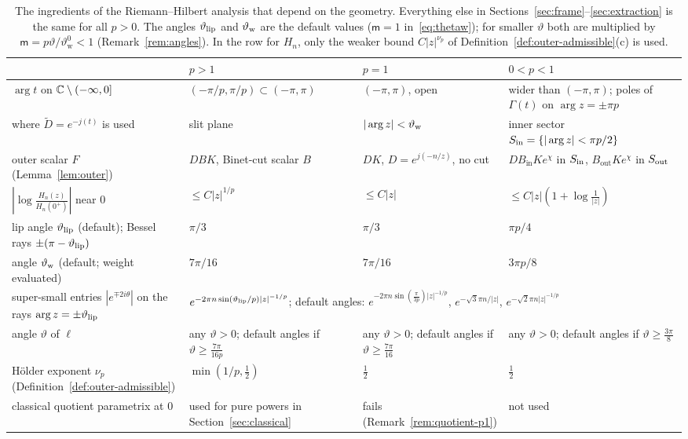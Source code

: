 \begin{table}[ht]
\centering\small
\renewcommand{\arraystretch}{1.25}
\begin{tabular}{@{}p{3.3cm}p{3.2cm}p{3.1cm}p{3.6cm}@{}}
\toprule
& $p>1$ & $p=1$ & $0<p<1$\tabularnewline
\midrule
\raggedright $\arg t$ on $\mathbb{C}\setminus(-\infty,0]$ & \raggedright $(-\pi/p,\pi/p)\subset(-\pi,\pi)$ & \raggedright $(-\pi,\pi)$, open & \raggedright wider than $(-\pi,\pi)$; poles of $\Gamma(t)$ on $\arg z=\pm\pi p$\tabularnewline
\raggedright where $\tilde D=e^{-j(t)}$ is used & \raggedright slit plane & \raggedright $|\arg z|<\vartheta_{\mathrm{w}}$ & \raggedright inner sector $S_{\mathrm{in}}=\{|\arg z|<\pi p/2\}$\tabularnewline
\raggedright outer scalar $F$ (Lemma~\ref{lem:outer}) & \raggedright $DBK$, Binet-cut scalar $B$ & \raggedright $DK$, $D=e^{j(-n/z)}$, no cut & \raggedright $DB_{\mathrm{in}}Ke^{\chi}$ in $S_{\mathrm{in}}$, $B_{\mathrm{out}}Ke^{\chi}$ in $S_{\mathrm{out}}$\tabularnewline
\raggedright $|\log\frac{H_n(z)}{H_n(0^+)}|$ near $0$ & \raggedright $\le C|z|^{1/p}$ & \raggedright $\le C|z|$ & \raggedright $\le C|z|(1+\log\frac1{|z|})$\tabularnewline
\raggedright lip angle $\vartheta_{\mathrm{lip}}$ (default); Bessel rays $\pm(\pi-\vartheta_{\mathrm{lip}})$ & \raggedright $\pi/3$ & \raggedright $\pi/3$ & \raggedright $\pi p/4$\tabularnewline
\raggedright angle $\vartheta_{\mathrm{w}}$ (default; weight evaluated) & \raggedright $7\pi/16$ & \raggedright $7\pi/16$ & \raggedright $3\pi p/8$\tabularnewline
\raggedright super-small entries $|e^{\mp2i\theta}|$ on the rays $\arg z=\pm\vartheta_{\mathrm{lip}}$ & \multicolumn{3}{p{10.3cm}}{\raggedright $e^{-2\pi n\sin(\vartheta_{\mathrm{lip}}/p)|z|^{-1/p}}$; default angles: $e^{-2\pi n\sin(\frac{\pi}{3p})|z|^{-1/p}}$, $e^{-\sqrt3\pi n/|z|}$, $e^{-\sqrt2\pi n|z|^{-1/p}}$}\tabularnewline
\raggedright angle $\vartheta$ of $\ell$ & \raggedright any $\vartheta>0$; default angles if $\vartheta\ge\frac{7\pi}{16p}$ & \raggedright any $\vartheta>0$; default angles if $\vartheta\ge\frac{7\pi}{16}$ & \raggedright any $\vartheta>0$; default angles if $\vartheta\ge\frac{3\pi}{8}$\tabularnewline
\raggedright H\"older exponent $\nu_p$ (Definition~\ref{def:outer-admissible}) & \raggedright $\min(1/p,\frac12)$ & \raggedright $\frac12$ & \raggedright $\frac12$\tabularnewline
\raggedright classical quotient parametrix at $0$ & \raggedright used for pure powers in Section~\ref{sec:classical} & \raggedright fails (Remark~\ref{rem:quotient-p1}) & \raggedright not used\tabularnewline
\bottomrule
\end{tabular}
\caption{The ingredients of the Riemann--Hilbert analysis that depend on the geometry. Everything else in
Sections~\ref{sec:frame}--\ref{sec:extraction} is the same for all $p>0$. The angles $\vartheta_{\mathrm{lip}}$ and $\vartheta_{\mathrm{w}}$ are the
default values ($\mathsf m=1$ in~\eqref{eq:thetaw}); for smaller $\vartheta$ both are multiplied by
$\mathsf m=p\vartheta/\vartheta^0_{\mathrm w}<1$ (Remark~\ref{rem:angles}). In the row for $H_n$, only the weaker bound
$C|z|^{\nu_p}$ of Definition~\ref{def:outer-admissible}(c) is used.}
\label{tab:geometry}
\end{table}

